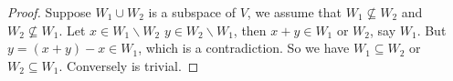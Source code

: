 \begin{proof}
	Suppose $W_{1} \cup W_{2}$ is a subspace of $V$, we assume that $W_{1} \nsubseteq W_{2}$ and $W_{2} \nsubseteq W_{1}$. Let $x \in W_{1} \backslash W_{2}$ $y \in W_{2} \backslash W_{1}$, then $x+y \in W_{1}$ or $W_{2}$, say $W_{1}$. But $y=(x+y)-x \in W_{1}$, which is a contradiction. So we have $W_{1} \subseteq W_{2}$ or $W_{2} \subseteq W_{1}$. Conversely is trivial.
\end{proof}